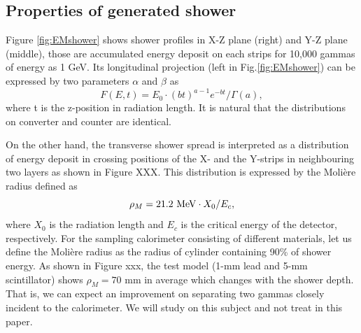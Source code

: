 \documentclass[jkps,preprint,fleqn,showpacs,showkeys]{revtex4}
\begin{document}
\subsection{Properties of generated shower}
Figure \ref{fig:EMshower} shows shower profiles in X-Z plane (right) and Y-Z plane (middle), those are accumulated energy deposit on each strips for 10,000 gammas of energy as 1 GeV.
Its longitudinal projection (left in Fig.\ref{fig:EMshower}) %
can be expressed by two parameters $\alpha$ and $\beta$ as %
\begin{equation}
    F(E,t)=E_0\cdot (bt)^{a-1}e^{-bt}/\Gamma(a),
\end{equation}
where t is the z-position in radiation length. It is natural that the distributions on converter and counter are identical. 

On the other hand, the transverse shower spread is interpreted as a distribution of energy deposit in crossing positions of the X- and the Y-strips in neighbouring two layers as shown in Figure XXX.  This distribution is expressed by the Molière radius defined as 
\begin{equation}
\rho_M= 21.2~{\rm MeV}\cdot X_0 /E_c,
\end{equation}
where $X_0$ is the radiation length and $E_c$ is the critical energy of the detector, respectively. 
For the sampling calorimeter consisting of different materials, let us define the Molière radius as the radius of cylinder containing 90\% of shower energy. As shown in Figure xxx, the test model (1-mm lead and 5-mm scintillator) shows $\rho_M=70$ mm in average which changes with the shower depth. 
That is, we can expect an improvement on separating two gammas closely incident to the calorimeter. We will study on this subject and not treat in this paper.
\end{document}
